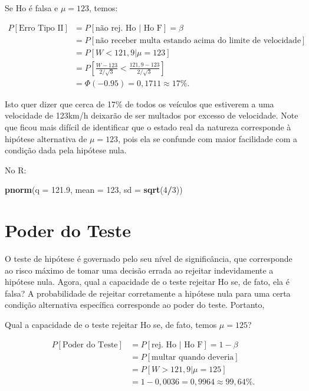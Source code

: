 \documentclass[
]{book}
\newenvironment{Shaded}{\begin{snugshade}}{\end{snugshade}}
\newcommand{\DataTypeTok}[1]{\textcolor[rgb]{0.13,0.29,0.53}{#1}}
\newcommand{\DecValTok}[1]{\textcolor[rgb]{0.00,0.00,0.81}{#1}}
\newcommand{\FloatTok}[1]{\textcolor[rgb]{0.00,0.00,0.81}{#1}}
\newcommand{\KeywordTok}[1]{\textcolor[rgb]{0.13,0.29,0.53}{\textbf{#1}}}
\newcommand{\NormalTok}[1]{#1}
\newcommand{\OperatorTok}[1]{\textcolor[rgb]{0.81,0.36,0.00}{\textbf{#1}}}
\theoremstyle{definition}
\theoremstyle{definition}
\theoremstyle{definition}
\theoremstyle{remark}
\begin{document}
Se Ho é falsa e \(\mu = 123\), temos:

\begin{align*}
P[\text{Erro Tipo II}] 
&= P [\text{não rej. Ho | Ho F}] = \beta\\
&= P [\text{não receber multa estando acima do limite de velocidade}]\\
&= P [W < 121,9 | \mu= 123]\\
&= P \left[\frac{W - 123}{2/\sqrt{3}} < \frac{121,9 - 123}{2/\sqrt{3}} \right]\\   
&= \Phi (-0.95) = 0,1711 \approx 17\%.  
\end{align*}

Isto quer dizer que cerca de 17\% de todos os veículos que estiverem a uma velocidade de 123km/h deixarão de ser multados por excesso de velocidade. Note que ficou mais difícil de identificar que o estado real da natureza corresponde à hipótese alternativa de \(\mu = 123\), pois ela se confunde com maior facilidade com a condição dada pela hipótese nula.

No R:

\begin{Shaded}
\begin{Highlighting}[]
\KeywordTok{pnorm}\NormalTok{(}\DataTypeTok{q =} \FloatTok{121.9}\NormalTok{, }\DataTypeTok{mean =} \DecValTok{123}\NormalTok{, }\DataTypeTok{sd =} \KeywordTok{sqrt}\NormalTok{(}\DecValTok{4}\OperatorTok{/}\DecValTok{3}\NormalTok{))}
\end{Highlighting}
\end{Shaded}

\hypertarget{poder-do-teste}{%
\section{Poder do Teste}\label{poder-do-teste}}

O teste de hipótese é governado pelo seu nível de significância, que corresponde ao risco máximo de tomar uma decisão errada ao rejeitar indevidamente a hipótese nula. Agora, qual a capacidade de o teste rejeitar Ho se, de fato, ela é falsa? A probabilidade de rejeitar corretamente a hipótese nula para uma certa condição alternativa específica corresponde ao poder do teste. Portanto,

Qual a capacidade de o teste rejeitar Ho se, de fato, temos \(\mu=125\)?

\begin{align*}
P[\text{Poder do Teste}] 
&= P [\text{rej. Ho | Ho F}] = 1 - \beta\\
&= P [\text{multar quando deveria}]\\
&= P [W > 121,9 | \mu= 125]\\
&= 1-0,0036 = 0,9964  \approx 99,64\%.  
\end{align*}
\end{document}
